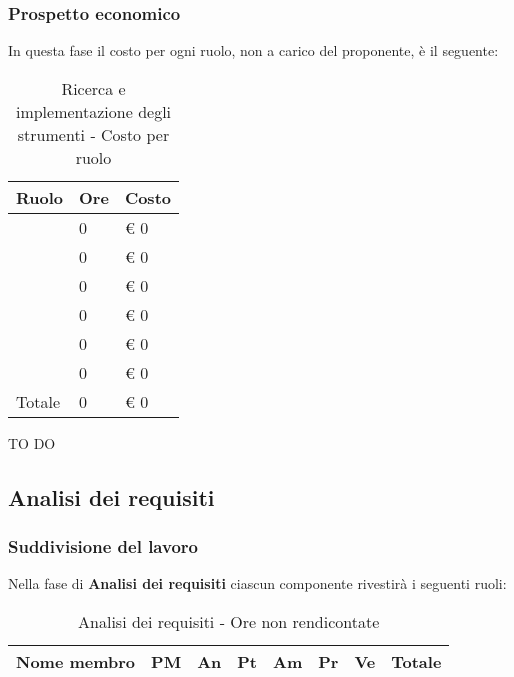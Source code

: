 		\subsubsection{Prospetto economico} %
		\label{ssub:prospetto_economico}
		In questa fase il costo per ogni ruolo, non a carico del proponente, è il seguente: \\
			\begin{table}[!h]
				\begin{center}
					\begin{tabularx}{0.6\textwidth}{|l|l|X|}
						\hline
						\textbf{Ruolo} & \textbf{Ore} & \textbf{Costo} \\
						\hline
						\roleProjectManager & 0 & \euro{} 0 \\
						\hline
						\roleAnalyst & 0 & \euro{} 0 \\
						\hline
						\roleDesigner & 0 & \euro{} 0 \\
						\hline
						\roleAdministrator & 0 & \euro{} 0 \\
						\hline
						\roleProgrammer & 0 & \euro{} 0 \\
						\hline
						\roleVerifier & 0 & \euro{} 0 \\
						\hline
						Totale & 0 & \euro{} 0 \\
						\hline
					\end{tabularx}
				\end{center}
			\caption{Ricerca e implementazione degli strumenti - Costo per ruolo}
			\end{table}

		\noindent
		TO DO
		
	
	
	\subsection{Analisi dei requisiti} %
	\label{sub:analisi_dei_requisiti}
		\subsubsection{Suddivisione del lavoro} %
		\label{ssub:suddivisione_del_lavoro}
		Nella fase di \textbf{Analisi dei requisiti} ciascun componente rivestirà i seguenti ruoli: \\
			\begin{table}[!h]
				\begin{center}
					\begin{tabularx}{0.9\textwidth}{|l|l|l|l|l|l|l|X|}
						\hline
						\textbf{Nome membro} & \textbf{PM} & \textbf{An} & \textbf{Pt} & \textbf{Am} & \textbf{Pr} & \textbf{Ve} & \textbf{Totale} \\
						\hline
						
						\hline		
					\end{tabularx}
				\end{center}
			\caption{Analisi dei requisiti - Ore non rendicontate}
			\end{table}
		
